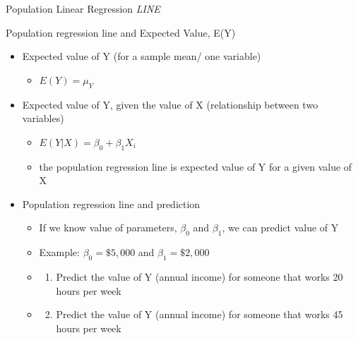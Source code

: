 \documentclass[
  8pt,
  ignorenonframetext,
  dvipsnames]{beamer}
\providecommand{\tightlist}{%
  \setlength{\itemsep}{0pt}\setlength{\parskip}{0pt}}
\let\olditem\item
\renewcommand{\item}{%
  \olditem\vspace{4pt}
}
\begin{document}
\begin{frame}{Population Linear Regression \emph{LINE}}
\protect\hypertarget{population-linear-regression-line-2}{}

Population regression line and Expected Value, E(Y)

\begin{itemize}
\tightlist
\item
  Expected value of Y (for a sample mean/ one variable)

  \begin{itemize}
  \tightlist
  \item
    \(E(Y) = \mu_Y\)
  \end{itemize}
\end{itemize}

\medskip

\begin{itemize}
\tightlist
\item
  Expected value of Y, given the value of X (relationship between two
  variables)

  \begin{itemize}
  \tightlist
  \item
    \(E(Y|X) = \beta_0 + \beta_1X_i\)
  \item
    the population regression line is expected value of Y for a given
    value of X
  \end{itemize}
\end{itemize}

\medskip

\begin{itemize}
\tightlist
\item
  Population regression line and prediction

  \begin{itemize}
  \item
    If we know value of parameters, \(\beta_0\) and \(\beta_1\), we can
    predict value of Y
  \item
    Example: \(\beta_0=\$5,000\) and \(\beta_1=\$2,000\)
  \item
    \begin{enumerate}
    [(1)]
    \tightlist
    \item
      Predict the value of Y (annual income) for someone that works 20
      hours per week
    \end{enumerate}
  \item
    \begin{enumerate}
    [(1)]
    \setcounter{enumi}{1}
    \tightlist
    \item
      Predict the value of Y (annual income) for someone that works 45
      hours per week
    \end{enumerate}
  \end{itemize}
\end{itemize}

\end{frame}
\end{document}
